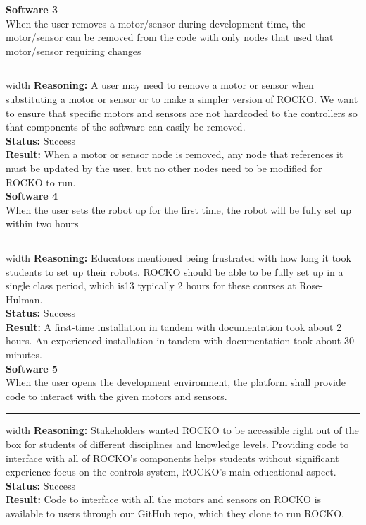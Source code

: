 \documentclass{fank1basedocument}
\begin{document}
{\large \textbf{Software 3}}\\
When the user removes a motor/sensor during development time, the motor/sensor can be removed from the code with only nodes that used that motor/sensor requiring changes
\hrule width \linewidth
\vspace{2px}
\textbf{Reasoning:} A user may need to remove a motor or sensor when substituting a motor or sensor or to make a simpler version of ROCKO. We want to ensure that specific motors and sensors are not hardcoded to the controllers so that components of the software can easily be removed.\\
\textbf{Status:} \color{ForestGreen}Success\color{black}\\
\textbf{Result:} When a motor or sensor node is removed, any node that references it must be updated by the user, but no other nodes need to be modified for ROCKO to run.\\

{\large \textbf{Software 4}}\\
When the user sets the robot up for the first time, the robot will be fully set up within two hours
\hrule width \linewidth
\vspace{2px}
\textbf{Reasoning:} Educators mentioned being frustrated with how long it took students to set up their robots. ROCKO should be able to be fully set up in a single class period, which is13 typically 2 hours for these courses at Rose- Hulman.\\
\textbf{Status:} \color{ForestGreen}Success\color{black}\\
\textbf{Result:} A first-time installation in tandem with documentation took about 2 hours. An experienced installation in tandem with documentation took about 30 minutes.\\

{\large \textbf{Software 5}}\\
When the user opens the development environment, the platform shall provide code to interact with the given motors and sensors.
\hrule width \linewidth
\vspace{2px}
\textbf{Reasoning:} Stakeholders wanted ROCKO to be accessible right out of the box for students of different disciplines and knowledge levels. Providing code to interface with all of ROCKO’s components helps students without significant experience focus on the controls system, ROCKO’s main educational aspect.\\
\textbf{Status:} \color{ForestGreen}Success\color{black}\\
\textbf{Result:} Code to interface with all the motors and sensors on ROCKO is available to users through our GitHub repo, which they clone to run ROCKO.\\
\end{document}
